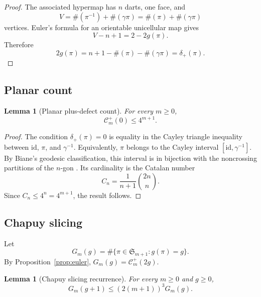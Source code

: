 \documentclass[11pt]{article}
\numberwithin{equation}{section}
\newtheorem{lemma}[theorem]{Lemma}
\newcommand{\Sym}{\mathfrak S}
\newcommand{\cyc}{\#}
\newcommand{\id}{\mathrm{id}}
\newcommand{\g}{\gamma}
\newcommand{\ddp}{\delta_{+}}
\newcommand{\Countp}{\mathcal C^{+}}
\begin{document}
\begin{proof}
The associated hypermap has \(n\) darts, one face, and
\[
  V=\cyc(\pi^{-1})+\cyc(\g\pi)=\cyc(\pi)+\cyc(\g\pi)
\]
vertices.  Euler's formula for an orientable unicellular map gives
\[
  V-n+1=2-2g(\pi).
\]
Therefore
\[
  2g(\pi)=n+1-\cyc(\pi)-\cyc(\g\pi)=\ddp(\pi).
\]
\end{proof}

\subsection{Planar count}

\begin{lemma}[Planar plus-defect count]\label{lem:planar}
For every \(m\ge0\),
\[
  \Countp_m(0)\le 4^{m+1}.
\]
\end{lemma}

\begin{proof}
The condition \(\ddp(\pi)=0\) is equality in the Cayley triangle inequality
between \(\id\), \(\pi\), and \(\g^{-1}\).  Equivalently, \(\pi\) belongs to
the Cayley interval \([\id,\g^{-1}]\).  By Biane's geodesic classification,
this interval is in bijection with the noncrossing partitions of the
\(n\)-gon \cite{biane_properties_1997}.  Its cardinality is the Catalan number
\[
  C_n=\frac{1}{n+1}\binom{2n}{n}.
\]
Since \(C_n\le 4^n=4^{m+1}\), the result follows.
\end{proof}

\subsection{Chapuy slicing}

Let
\[
  G_m(g)=\#\{\pi\in\Sym_{m+1}:g(\pi)=g\}.
\]
By Proposition~\ref{prop:euler}, \(G_m(g)=\Countp_m(2g)\).

\begin{lemma}[Chapuy slicing recurrence]\label{lem:slicing}
For every \(m\ge0\) and \(g\ge0\),
\[
  G_m(g+1)\le (2(m+1))^3G_m(g).
\]
\end{lemma}
\end{document}
